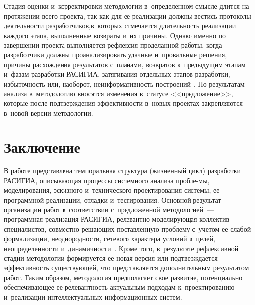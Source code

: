 \begin{multicols}{2}
  Стадия оценки и~корректировки методологии в~определенном смысле длится 
на протяжении всего проекта, так как для ее реализации долж\-ны вес\-тись 
протоколы де\-я\-тель\-ности разработчиков,\linebreak в~которых отмечается дли\-тель\-ность 
реализации каж\-до\-го этапа, выполненные возвраты и~их причины. Однако 
именно по завершении проекта выполняется рефлексия проделанной работы, 
когда разработчики долж\-ны проанализировать удачные и~провальные решения, 
причины рас\-хож\-де\-ния результатов с~планами, возвратов к~предыду\-щим этапам 
и~фазам разработки \mbox{РАСИГИА}, затягивания отдельных этапов 
разработки, из\-бы\-точ\-ность или, наоборот, не\-ин\-фор\-ма\-тив\-ность 
по\-стро\-ений~\cite{4-lis}. По результатам анализа в~методологию вносятся 
изменения в~статусе <<предложение>>, которые после под\-тверж\-де\-ния 
эф\-фек\-тив\-ности в~новых проектах закрепляются в~новой версии методологии.

\vspace*{-9pt}

\section{Заключение}

\vspace*{-3pt}

  В работе представлена темпоральная структура (жизненный цикл) 
разработки \mbox{РАСИГИА}, опи\-сы\-ва\-ющая процессы сис\-тем\-но\-го анализа 
проб\-ле-\linebreak мы, моделирования, эскизного и~технического \mbox{проектирования} сис\-те\-мы, 
ее программной реализации, отладки и~тестирования. 
Основной результат 
организации работ в~соответствии с~предложенной методологией~--- 
программная реализация \mbox{РАСИГИА}, релевантно моделирующая 
коллектив специалистов, со\-вмест\-но ре\-ша\-ющих по\-став\-лен\-ную проб\-ле\-му 
с~учетом ее слабой формализации, не\-од\-но\-род\-ности, сетевого характера условий 
и~целей, не\-опре\-де\-лен\-ности и~ди\-на\-мич\-ности~\cite{5-lis}. Кроме того, в~результате 
рефлексивной стадии методологии формируется ее новая версия или 
подтверждается эф\-фек\-тив\-ность су\-щест\-ву\-ющей, что представляется\linebreak 
дополнительным результатом работ. Таким образом, методология предполагает 
свое развитие, потенциально обеспечивающее ее ре\-ле\-вант\-ность \mbox{актуальным}
подходам к~проектированию и~реализации интеллектуальных информационных 
сис\-тем.


\end{multicols}
